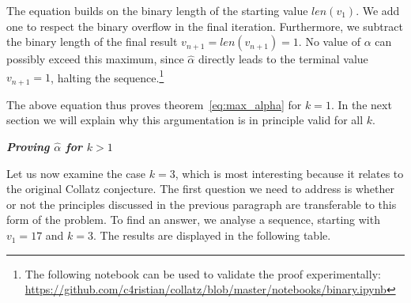 \documentclass{SciPress_2015}
\renewcommand{\subsection}[1]{\textit{\textbf{#1}}}
\begin{document}
The equation builds on the binary length of the starting value $len(v_1)$. We add one to respect the binary overflow in the final iteration. Furthermore, we subtract the binary length of the final result $v_{n+1}=len(v_{n+1})=1$. No value of $\alpha$ can possibly exceed this maximum, since $\hat\alpha$ directly leads to the terminal value $v_{n+1}=1$, halting the sequence.\footnote{The following notebook can be used to validate the proof experimentally:\\ \hspace*{7mm}\url{https://github.com/c4ristian/collatz/blob/master/notebooks/binary.ipynb}}

\newpage
\par\noindent
The above equation thus proves theorem~\ref{eq:max_alpha} for $k=1$. In the next section we will explain why this argumentation is in principle valid for all $k$.

\vspace{1em}\noindent
\subsection{Proving \boldmath$\hat\alpha$ for \boldmath$k>1$}
\par\noindent
Let us now examine the case $k=3$, which is most interesting because it relates to the original Collatz conjecture. The first question we need to address is whether or not the principles discussed in the previous paragraph are transferable to this form of the problem. To find an answer, we analyse a sequence, starting with $v_1=17$ and $k=3$. The results are displayed in the following table.
\end{document}
